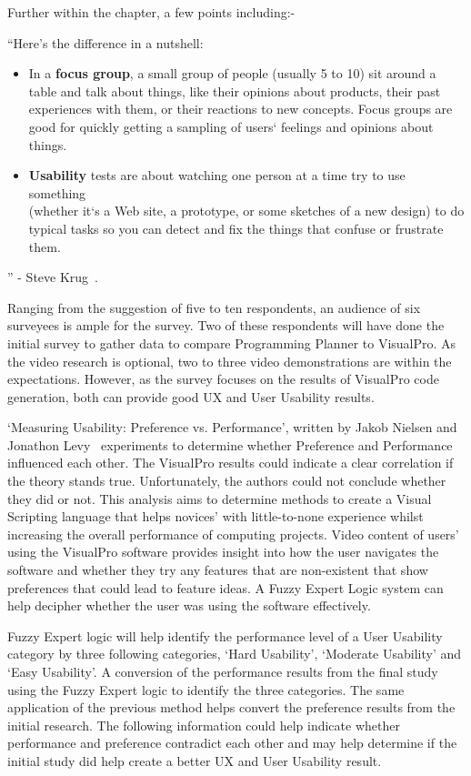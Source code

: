 \documentclass[12pt]{report} %
\begin{document}
	Further within the chapter, a few points including:-
	\begin{center}
		``Here's the difference in a nutshell:
		\begin{itemize}
			\item In a \textbf{focus group}, a small group of people (usually 5 to 10) sit around a table and talk about things, like their opinions about products, their past experiences with them, or their reactions to new concepts. Focus groups are good for quickly getting a sampling of users` feelings and opinions about things.
			\item \textbf{Usability} tests are about watching one person at a time try to use something\\(whether it`s a Web site, a prototype, or some sketches of a new design) to do typical tasks so you can detect and fix the things that confuse or frustrate them.
		\end{itemize}
		'' - Steve Krug~\cite{krug_steve_dont_2014}.
	\end{center}

	Ranging from the suggestion of five to ten respondents, an audience of six surveyees is ample for the survey. Two of these respondents will have done the initial survey to gather data to compare Programming Planner to VisualPro. As the video research is optional, two to three video demonstrations are within the expectations. However, as the survey focuses on the results of VisualPro code generation, both can provide good UX and User Usability results.

	`Measuring Usability: Preference vs. Performance', written by Jakob Nielsen and Jonathon Levy~\cite{nielsen_measuring_1994} experiments to determine whether Preference and Performance influenced each other. The VisualPro results could indicate a clear correlation if the theory stands true.
	Unfortunately, the authors could not conclude whether they did or not. This analysis aims to determine methods to create a Visual Scripting language that helps novices' with little-to-none experience whilst increasing the overall performance of computing projects. Video content of users' using the VisualPro software provides insight into how the user navigates the software and whether they try any features that are non-existent that show preferences that could lead to feature ideas. A Fuzzy Expert Logic system can help decipher whether the user was using the software effectively.

	Fuzzy Expert logic will help identify the performance level of a User Usability category by three following categories, `Hard Usability', `Moderate Usability' and `Easy Usability'. A conversion of the performance results from the final study using the Fuzzy Expert logic to identify the three categories. The same application of the previous method helps convert the preference results from the initial research. The following information could help indicate whether performance and preference contradict each other and may help determine if the initial study did help create a better UX and User Usability result.
\end{document}
